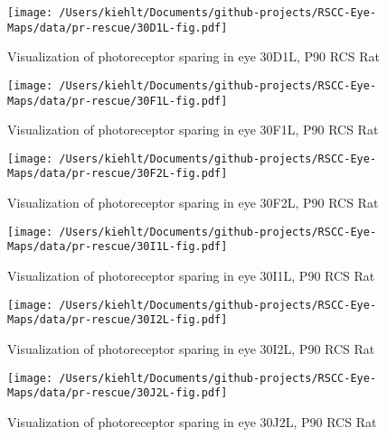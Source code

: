 \documentclass{article}
\begin{document}
\begin{center}
\begin{figure}
\texttt{[image: /Users/kiehlt/Documents/github-projects/RSCC-Eye-Maps/data/pr-rescue/30D1L-fig.pdf]}
\caption{Visualization of photoreceptor sparing in eye 30D1L, P90 RCS Rat}
\label{fig:30D1L}
\end{figure}

\end{center}
\begin{center}
\begin{figure}
\texttt{[image: /Users/kiehlt/Documents/github-projects/RSCC-Eye-Maps/data/pr-rescue/30F1L-fig.pdf]}
\caption{Visualization of photoreceptor sparing in eye 30F1L, P90 RCS Rat}
\label{fig:30F1L}
\end{figure}

\end{center}
\begin{center}
\begin{figure}
\texttt{[image: /Users/kiehlt/Documents/github-projects/RSCC-Eye-Maps/data/pr-rescue/30F2L-fig.pdf]}
\caption{Visualization of photoreceptor sparing in eye 30F2L, P90 RCS Rat}
\label{fig:30F2L}
\end{figure}

\end{center}
\begin{center}
\begin{figure}
\texttt{[image: /Users/kiehlt/Documents/github-projects/RSCC-Eye-Maps/data/pr-rescue/30I1L-fig.pdf]}
\caption{Visualization of photoreceptor sparing in eye 30I1L, P90 RCS Rat}
\label{fig:30I1L}
\end{figure}

\end{center}
\begin{center}
\begin{figure}
\texttt{[image: /Users/kiehlt/Documents/github-projects/RSCC-Eye-Maps/data/pr-rescue/30I2L-fig.pdf]}
\caption{Visualization of photoreceptor sparing in eye 30I2L, P90 RCS Rat}
\label{fig:30I2L}
\end{figure}

\end{center}
\begin{center}
\begin{figure}
\texttt{[image: /Users/kiehlt/Documents/github-projects/RSCC-Eye-Maps/data/pr-rescue/30J2L-fig.pdf]}
\caption{Visualization of photoreceptor sparing in eye 30J2L, P90 RCS Rat}
\label{fig:30J2L}
\end{figure}

\end{center}
\end{document}
